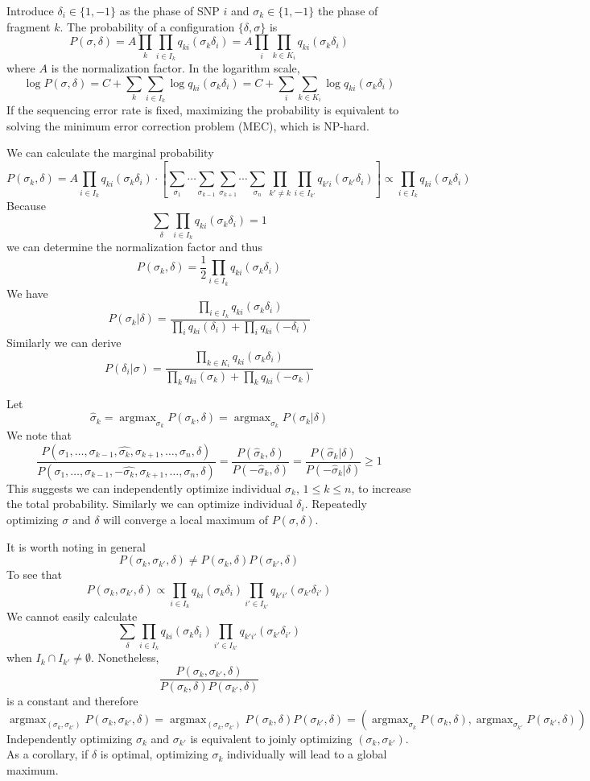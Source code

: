\documentclass[10pt]{article}
\DeclareMathOperator*{\argmax}{argmax}
\begin{document}
Introduce $\delta_i\in\{1,-1\}$ as the phase of SNP $i$ and
$\sigma_k\in\{1,-1\}$ the phase of fragment $k$. The probability of a configuration $\{\delta,\sigma\}$ is
$$
P(\sigma,\delta)=A\prod_{k}\prod_{i\in I_k}q_{ki}(\sigma_k\delta_i)=A\prod_{i}\prod_{k\in K_i}q_{ki}(\sigma_k\delta_i)
$$
where $A$ is the normalization factor. In the logarithm scale,
$$
\log P(\sigma,\delta)=C+\sum_k\sum_{i\in I_k}\log q_{ki}(\sigma_k\delta_i)=C+\sum_i\sum_{k\in K_i}\log q_{ki}(\sigma_k\delta_i)
$$
If the sequencing error rate is fixed, maximizing the probability is equivalent
to solving the minimum error correction problem (MEC), which is NP-hard.

We can calculate the marginal probability
$$
P(\sigma_k,\delta)
=A\prod_{i\in I_k}q_{ki}(\sigma_k\delta_i)\cdot\left[\sum_{\sigma_1}\cdots\sum_{\sigma_{k-1}}\sum_{\sigma_{k+1}}\cdots\sum_{\sigma_n}\prod_{k'\not=k}\prod_{i\in I_{k'}}q_{k'i}(\sigma_{k'}\delta_i)\right]
\propto\prod_{i\in I_k}q_{ki}(\sigma_k\delta_i)
$$
Because
$$
\sum_{\delta}\prod_{i\in I_k}q_{ki}(\sigma_k\delta_i)=1
$$
we can determine the normalization factor and thus
$$
P(\sigma_k,\delta)=\frac{1}{2}\prod_{i\in I_k}q_{ki}(\sigma_k\delta_i)
$$
We have
$$
P(\sigma_k|\delta)=\frac{\prod_{i\in I_k}q_{ki}(\sigma_k\delta_i)}{\prod_iq_{ki}(\delta_i)+\prod_iq_{ki}(-\delta_i)}
$$
Similarly we can derive
$$
P(\delta_i|\sigma)=\frac{\prod_{k\in K_i}q_{ki}(\sigma_k\delta_i)}{\prod_kq_{ki}(\sigma_k)+\prod_kq_{ki}(-\sigma_k)}
$$

Let
$$
\hat{\sigma}_k=\argmax_{\sigma_k}P(\sigma_k,\delta)=\argmax_{\sigma_k}P(\sigma_k|\delta)
$$
We note that
$$
\frac{P(\sigma_1,\ldots,\sigma_{k-1},\hat{\sigma_k},\sigma_{k+1},\ldots,\sigma_n,\delta)}{P(\sigma_1,\ldots,\sigma_{k-1},-\hat{\sigma_k},\sigma_{k+1},\ldots,\sigma_n,\delta)}
=\frac{P(\hat{\sigma}_k,\delta)}{P(-\hat{\sigma}_k,\delta)}
=\frac{P(\hat{\sigma}_k|\delta)}{P(-\hat{\sigma}_k|\delta)}
\ge1
$$
This suggests we can independently optimize individual $\sigma_k$, $1\le k\le
n$, to increase the total probability. Similarly we can optimize individual
$\delta_i$. Repeatedly optimizing $\sigma$ and $\delta$ will converge a local
maximum of $P(\sigma,\delta)$.

It is worth noting in general
$$
P(\sigma_k,\sigma_{k'},\delta)\not=P(\sigma_k,\delta)P(\sigma_{k'},\delta)
$$
To see that
$$
P(\sigma_k,\sigma_{k'},\delta)\propto\prod_{i\in I_k}q_{ki}(\sigma_k\delta_i)\prod_{i'\in I_{k'}}q_{k'i'}(\sigma_{k'}\delta_{i'})
$$
We cannot easily calculate
$$
\sum_{\delta}\prod_{i\in I_k}q_{ki}(\sigma_k\delta_i)\prod_{i'\in I_{k'}}q_{k'i'}(\sigma_{k'}\delta_{i'})
$$
when $I_k\cap I_{k'}\not=\emptyset$. Nonetheless,
$$
\frac{P(\sigma_k,\sigma_{k'},\delta)}{P(\sigma_k,\delta)P(\sigma_{k'},\delta)}
$$
is a constant and therefore
$$
\argmax_{(\sigma_k,\sigma_{k'})}P(\sigma_k,\sigma_{k'},\delta)=\argmax_{(\sigma_k,\sigma_{k'})}P(\sigma_k,\delta)P(\sigma_{k'},\delta)
=(\argmax_{\sigma_k}P(\sigma_k,\delta),\argmax_{\sigma_{k'}}P(\sigma_{k'},\delta))
$$
Independently optimizing $\sigma_k$ and $\sigma_{k'}$ is equivalent to joinly
optimizing $(\sigma_k,\sigma_{k'})$. As a corollary, if $\delta$ is optimal,
optimizing $\sigma_k$ individually will lead to a global maximum.
\end{document}
